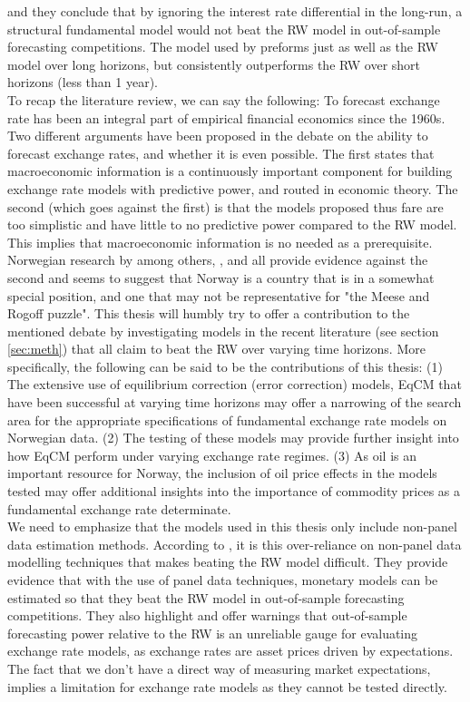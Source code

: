 \documentclass[10pt]{article}
\numberwithin{equation}{section}
\numberwithin{table}{section}
\numberwithin{figure}{section}
\begin{document}
\begin{spacing}{1.5}
and they conclude that by ignoring the interest rate differential in the long-run, a structural fundamental model would not beat the RW model in out-of-sample forecasting competitions. The model used by \cite{bjornland2006importance} preforms just as well as the RW model over long horizons, but consistently outperforms the RW over short horizons (less than 1 year).\\
\indent To recap the literature review, we can say the following: To forecast exchange rate has been an integral part of empirical financial economics since the 1960s. Two different arguments have been proposed in the debate on the ability to forecast exchange rates, and whether it is even possible. The first states that macroeconomic information is a continuously important component for building exchange rate models with predictive power, and routed in economic theory. The second (which goes against the first) is that the models proposed thus fare are too simplistic and have little to no predictive power compared to the RW model. This implies that macroeconomic information is no needed as a prerequisite. Norwegian research by among others, \cite{reinton1999out}, \cite{akram2000does,akram2004oil} and \cite{bjornland2006importance} all provide evidence against the second and seems to suggest that Norway is a country that is in a somewhat special position, and one that may not be representative for "the Meese and Rogoff puzzle". This thesis will humbly try to offer a contribution to the mentioned debate by investigating models in the recent literature (see section \ref{sec:meth}) that all claim to beat the RW over varying time horizons. More specifically, the following can be said to be the contributions of this thesis: (1) The extensive use of equilibrium correction (error correction) models, EqCM that have been successful at varying time horizons may offer a narrowing of the search area for the appropriate specifications of fundamental exchange rate models on Norwegian data. (2) The testing of these models may provide further insight into how EqCM perform under varying exchange rate regimes. (3) As oil is an important resource for Norway, the inclusion of oil price effects in the models tested may offer additional insights into the importance of commodity prices as a fundamental exchange rate determinate.\\
\indent We need to emphasize that the models used in this thesis only include non-panel data estimation methods. According to \cite{engel2007exchange}, it is this over-reliance on non-panel data modelling techniques that makes beating the RW model difficult. They provide evidence that with the use of panel data techniques, monetary models can be estimated so that they beat the RW model in out-of-sample forecasting competitions. They also highlight and offer warnings that out-of-sample forecasting power relative to the RW is an unreliable gauge for evaluating exchange rate models, as exchange rates are asset prices driven by expectations. The fact that we don't have a direct way of measuring market expectations, implies a limitation for exchange rate models as they cannot be tested directly.



\end{spacing}
\end{document}
